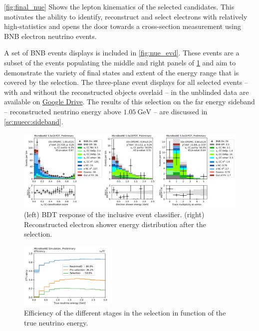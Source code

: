 \par
\cref{fig:final_nue} Shows the lepton kinematics of the selected \nuecc candidates. This motivates the ability to identify, reconstruct and select electrons with relatively high-statistics and opens the door towards a cross-section measurement using BNB electron neutrino events. 
\par
A set of BNB events displays is included in \cref{fig:nue_evd}. These events are a subset of the events populating the middle and right panels of \cref{fig:final_sel} and aim to demonstrate the variety of final states and extent of the energy range that is covered by the selection. The three-plane event displays for all selected events -- with and without the reconstructed objects overlaid -- in the unblinded data are available on \href{https://drive.google.com/drive/folders/1rezW9_xjSJZkJjEk1hVKypXJPCtMGZVP?usp=sharing}{Google Drive}. The results of this selection on the far energy sideband -- reconstructed neutrino energy above $\SI{1.05}{\GeV}$ -- are discussed in \cref{sc:nuecc:sideband}.

\begin{figure}[htb]
    \centering
    \includegraphics[width=\textwidth]{NueCCsel/Images/datamc/event_bdt_plus}
    \caption[Final \nuecc event classifier and reconstructed electron energy spectrum]{(left) BDT response of the \nuecc inclusive event classifier. (right) Reconstructed electron shower energy distribution after the selection.}
    \label{fig:final_sel}
\end{figure}

\begin{figure}[htb]
    \centering
    \includegraphics[width=0.4\textwidth]{NueCCsel/Images/truth/efficiency_2.pdf}
    \caption{Efficiency of the different stages in the selection in function of the true neutrino energy.}
    \label{fig:nueccinc_eff_all}
\end{figure}

